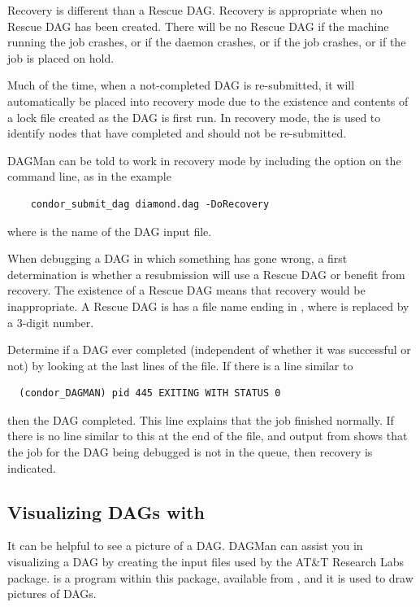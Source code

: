 Recovery is different than a Rescue DAG.
Recovery is appropriate when no Rescue DAG has been created.
There will be no Rescue DAG 
if the machine running the  job crashes,
or if the  daemon crashes,
or if the  job crashes,
or if the  job is placed on hold.

Much of the time, when a not-completed DAG is re-submitted,
it will automatically be placed into recovery mode
due to the existence and contents of a lock file created as the DAG
is first run.
In recovery mode, the  is used to identify
nodes that have completed and should not be re-submitted.

DAGMan can be told to work in recovery mode by including the
 option on the command line, as in the example
\begin{verbatim}
    condor_submit_dag diamond.dag -DoRecovery
\end{verbatim}
where  is the name of the DAG input file.

When debugging a DAG in which something has gone wrong,
a first determination is whether a resubmission will
use a Rescue DAG or benefit from recovery.
The existence of a Rescue DAG means that recovery would be inappropriate.
A Rescue DAG is has a file name ending in ,
where  is replaced by a 3-digit number.

Determine if a DAG ever completed 
(independent of whether it was successful or not) 
by looking at the last lines of the  file.
If there is a line similar to
\begin{verbatim}
  (condor_DAGMAN) pid 445 EXITING WITH STATUS 0
\end{verbatim}
then the DAG completed.
This line explains that the  job finished normally.
If there is no line similar to this at the end of the  file,
and output from  shows that the  job for
the DAG being debugged is not in the queue,
then recovery is indicated.

\subsection{Visualizing DAGs with }

It can be helpful to see a picture of a DAG.
DAGMan can assist you in visualizing a DAG by creating
the input files used by the AT\&T Research Labs 
 package. 
 is a program within this package,
available from ,
and it is used to draw pictures of DAGs. 

